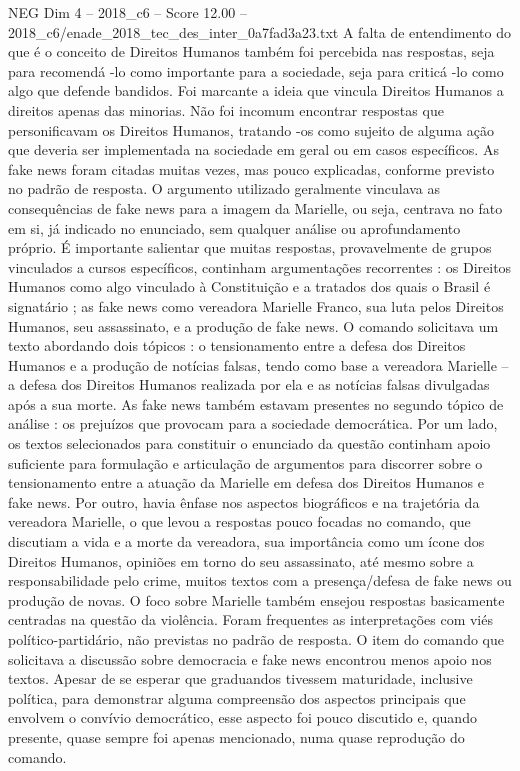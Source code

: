 \begin{textsample}{NEG Dim 4 – 2018\_c6 – Score 12.00 – 2018\_c6/enade\_2018\_tec\_des\_inter\_0a7fad3a23.txt}
A falta de entendimento do que é o conceito de Direitos Humanos também foi percebida nas respostas, seja para recomendá -lo como importante para a sociedade, seja para criticá -lo como algo que defende bandidos.
Foi marcante a ideia que vincula Direitos Humanos a direitos apenas das minorias.
Não foi incomum encontrar respostas que personificavam os Direitos Humanos, tratando -os como sujeito de alguma ação que deveria ser implementada na sociedade em geral ou em casos específicos.
As fake news foram citadas muitas vezes, mas pouco explicadas, conforme previsto no padrão de resposta.
O argumento utilizado geralmente vinculava as consequências de fake news para a imagem da Marielle, ou seja, centrava no fato em si, já indicado no enunciado, sem qualquer análise ou aprofundamento próprio.
É importante salientar que muitas respostas, provavelmente de grupos vinculados a cursos específicos, continham argumentações recorrentes : os Direitos Humanos como algo vinculado à Constituição e a tratados dos quais o Brasil é signatário ; as fake news como vereadora Marielle Franco, sua luta pelos Direitos Humanos, seu assassinato, e a produção de fake news.
O comando solicitava um texto abordando dois tópicos : o tensionamento entre a defesa dos Direitos Humanos e a produção de notícias falsas, tendo como base a vereadora Marielle – a defesa dos Direitos Humanos realizada por ela e as notícias falsas divulgadas após a sua morte.
As fake news também estavam presentes no segundo tópico de análise : os prejuízos que provocam para a sociedade democrática.
Por um lado, os textos selecionados para constituir o enunciado da questão continham apoio suficiente para formulação e articulação de argumentos para discorrer sobre o tensionamento entre a atuação da Marielle em defesa dos Direitos Humanos e fake news.
Por outro, havia ênfase nos aspectos biográficos e na trajetória da vereadora Marielle, o que levou a respostas pouco focadas no comando, que discutiam a vida e a morte da vereadora, sua importância como um ícone dos Direitos Humanos, opiniões em torno do seu assassinato, até mesmo sobre a responsabilidade pelo crime, muitos textos com a presença/defesa de fake news ou produção de novas.
O foco sobre Marielle também ensejou respostas basicamente centradas na questão da violência.
Foram frequentes as interpretações com viés político-partidário, não previstas no padrão de resposta.
O item do comando que solicitava a discussão sobre democracia e fake news encontrou menos apoio nos textos.
Apesar de se esperar que graduandos tivessem maturidade, inclusive política, para demonstrar alguma compreensão dos aspectos principais que envolvem o convívio democrático, esse aspecto foi pouco discutido e, quando presente, quase sempre foi apenas mencionado, numa quase reprodução do comando.

\end{textsample}
